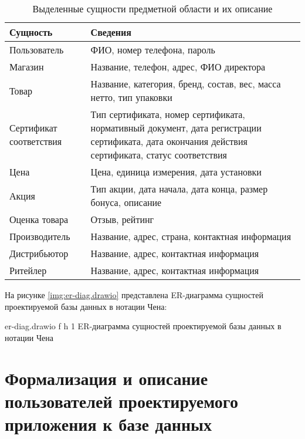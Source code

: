 \begin{table}[ht]
	\begin{center}
		\begin{threeparttable}
			\caption{Выделенные сущности предметной области и их описание}
			\label{tbl:db_entities}
			\begin{tabular}{|p{4.5cm}|p{10cm}|}
				\hline
				\textbf{Сущность} & \textbf{Сведения} \\ \hline
				Пользователь & ФИО, номер телефона, пароль \\ 
				\hline
				Магазин & Название, телефон, адрес, ФИО директора \\ 
				\hline
				Товар & Название, категория, бренд, состав, вес, масса нетто, тип упаковки \\ 
				\hline
				Сертификат соответствия & Тип сертификата, номер сертификата, нормативный документ, дата регистрации сертификата, дата окончания действия сертификата, статус соответствия \\ 
				\hline
				Цена & Цена, единица измерения, дата установки  \\ 
				\hline
				Акция & Тип акции, дата начала, дата конца, размер бонуса, описание \\ 
				\hline
				Оценка товара & Отзыв, рейтинг \\ 
				\hline
				Производитель & Название, адрес, страна, контактная информация \\ 
				\hline
				Дистрибьютор & Название, адрес, контактная информация \\ 
				\hline
				Ритейлер & Название, адрес, контактная информация \\ 
				\hline
			\end{tabular}
		\end{threeparttable}
	\end{center}
\end{table}

\clearpage

На рисунке \ref{img:er-diag.drawio} представлена ER-диаграмма сущностей проектируемой базы данных в нотации Чена:

{er-diag.drawio} %
{f} %
{h} %
{1\textwidth} %
{ER-диаграмма сущностей проектируемой базы данных в нотации Чена} %

\clearpage

\section{Формализация и описание пользователей проектируемого приложения к базе данных}

